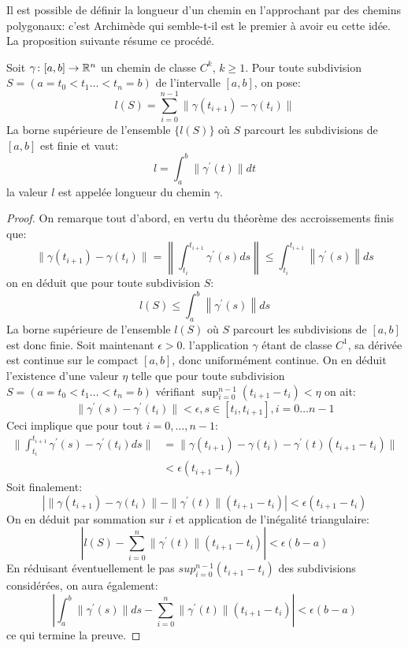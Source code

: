 Il est possible de définir la longueur d'un chemin en l'approchant par des chemins polygonaux: c'est Archimède qui semble-t-il est le premier à avoir eu cette idée. La proposition suivante résume ce procédé.
\begin{fprop}
Soit $\gamma \colon [a,b] \to \mathbb{R}^n$ un chemin de classe $C^k$, $k \geq 1$. Pour toute subdivision $S = (a=t_0 < t_1 \dots < t_n = b)$ de l'intervalle $[a,b]$, on pose:
\[
l(S) = \sum_{i=0}^{n-1} \| \gamma(t_{i+1}) - \gamma(t_i) \|
\]
La borne supérieure de l'ensemble $\{l(S)\}$ où $S$ parcourt les subdivisions de $[a,b]$ est finie et vaut:
\[
l = \int_a^b \|\gamma^\prime(t)\| dt
\]
la valeur $l$ est appelée longueur du chemin $\gamma$.
\end{fprop}
\begin{proof}
On remarque tout d'abord, en vertu du théorème des accroissements finis que:
\[
\| \gamma(t_{i+1}) - \gamma(t_i) \|  = \left\| \int_{t_i}^{t_{i+1}} \gamma^\prime(s) ds \right\| \leq \int_{t_i}^{t_{i+1}}\left\| \gamma^\prime(s) \right\|ds
\]
on en déduit que pour toute subdivision $S$:
\[
l(S) \leq  \int_a^b \left\| \gamma^\prime(s) \right\|ds
\]
La borne supérieure de l'ensemble $l(S)$ où $S$ parcourt les subdivisions de $[a,b]$ est donc finie. Soit maintenant $\epsilon > 0$. l'application $\gamma$ étant de classe $C^1$, sa dérivée est continue sur le compact $[a,b]$, donc uniformément continue. On en déduit l'existence d'une valeur $\eta$ telle que pour toute subdivision $S =  (a=t_0 < t_1 \dots < t_n = b)$ vérifiant $\sup_{i=0}^{n-1}(t_{i+1}-t_i) < \eta$ on ait:
\[
\| \gamma^\prime(s) - \gamma^\prime(t_i)\| < \epsilon, s \in [t_i, t_{i+1}], i=0 \dots n-1
\]
Ceci implique que pour tout $i=0,\dots,n-1$:
\begin{align*}
\|\int_{t_i}^{t_{i+1}} \gamma^\prime(s) - \gamma^\prime(t_i) ds\| & = \| \gamma(t_{i+1}) - \gamma(t_i) - \gamma^\prime(t) (t_{i+1}- t_i) \| \\& < \epsilon (t_{i+1}-t_i)
\end{align*}
Soit finalement:
\[
\left| \|\gamma(t_{i+1}) - \gamma(t_i)\| -  \|\gamma^\prime(t) \|(t_{i+1}-t_i)\right | < \epsilon (t_{i+1}-t_i)
\]
On en déduit par sommation sur $i$ et application de l'inégalité triangulaire:
\[
\left|l(S) - \sum_{i=0}^n  \|\gamma^\prime(t) \|(t_{i+1}-t_i)\right| < \epsilon (b-a) 
\]
En réduisant éventuellement le pas $sup_{i=0}^{n-1}(t_{i+1}-t_i)$ des subdivisions considérées, on aura également:
\[
\left | \int_a^b \|\gamma^\prime(s)\| ds -  \sum_{i=0}^n  \|\gamma^\prime(t) \|(t_{i+1}-t_i)\right| < \epsilon (b-a) 
\]
ce qui termine la preuve. 
\end{proof}
